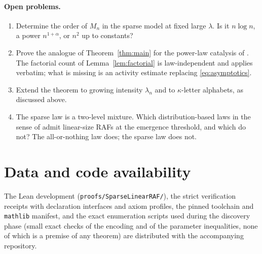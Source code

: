 \documentclass[11pt,a4paper]{article}
\theoremstyle{plain}
\theoremstyle{definition}
\theoremstyle{remark}
\begin{document}
\paragraph{Open problems.}
\begin{enumerate}
\item Determine the order of $M_n$ in the sparse model at fixed large $\lambda$. Is it $n\log n$, a power $n^{1+\alpha}$, or $n^2$ up to constants?
\item Prove the analogue of Theorem~\ref{thm:main} for the power-law catalysis of \cite{hordijk2014powerlaw,hordijk2016variable}. The factorial count of Lemma~\ref{lem:factorial} is law-independent and applies verbatim; what is missing is an activity estimate replacing \eqref{eq:asymptotics}.
\item Extend the theorem to growing intensity $\lambda_n$ and to $\kappa$-letter alphabets, as discussed above.
\item The sparse law is a two-level mixture. Which distribution-based laws in the sense of \cite{hordijk2016variable} admit linear-size RAFs at the emergence threshold, and which do not? The all-or-nothing law does; the sparse law does not.
\end{enumerate}

\section*{Data and code availability}

The Lean development (\texttt{proofs/SparseLinearRAF/}), the strict verification receipts with declaration interfaces and axiom profiles, the pinned toolchain and \texttt{mathlib} manifest, and the exact enumeration scripts used during the discovery phase (small exact checks of the encoding and of the parameter inequalities, none of which is a premise of any theorem) are distributed with the accompanying repository.



\end{document}
